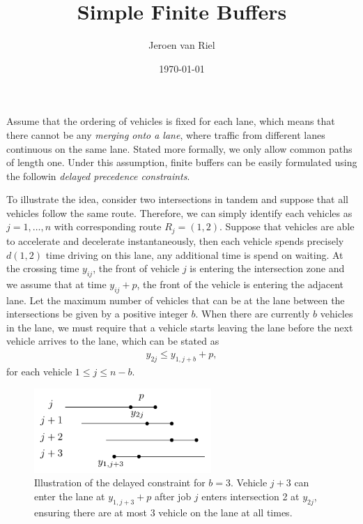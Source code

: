\documentclass{article}
\title{Simple Finite Buffers}
\author{Jeroen van Riel}
\date{\monthyeardate\today}
\theoremstyle{definition}
\theoremstyle{plain}
\begin{document}
\maketitle


Assume that the ordering of vehicles is fixed for each lane, which means that
there cannot be any \textit{merging onto a lane}, where traffic from different
lanes continuous on the same lane. Stated more formally, we only allow common
paths of length one. Under this assumption, finite buffers can be easily
formulated using the followin \textit{delayed precedence constraints}.

To illustrate the idea, consider two intersections in tandem and suppose that
all vehicles follow the same route. Therefore, we can simply identify each
vehicles as $j = 1, \dots, n$ with corresponding route $R_{j} = (1, 2)$.
%
Suppose that vehicles are able to accelerate and decelerate instantaneously,
then each vehicle spends precisely $d(1, 2)$ time driving on this lane, any
additional time is spend on waiting.
%
At the crossing time $y_{ij}$, the front of vehicle $j$ is entering the
intersection zone and we assume that at time $y_{ij} + p$, the front of the
vehicle is entering the adjacent lane. Let the maximum number of vehicles that
can be at the lane between the intersections be given by a positive integer $b$.
When there are currently $b$ vehicles in the lane, we must require that a
vehicle starts leaving the lane before the next vehicle arrives to the lane,
which can be stated as
\begin{align*}
  y_{2j} \leq y_{1,j+b} + p ,
\end{align*}
for each vehicle $1 \leq j \leq n - b$.

\begin{figure}
  \centering
  \includegraphics[width=0.6\textwidth]{figures/delayed-constraint.pdf}
  \caption{Illustration of the delayed constraint for $b=3$. Vehicle $j+3$ can
  enter the lane at $y_{1,j+3} + p$ after job $j$ enters intersection 2 at
  $y_{2j}$, ensuring there are at most $3$ vehicle on the lane at all times.}
  \label{fig:delayed-contraint}
\end{figure}
\end{document}
